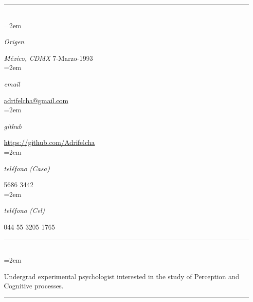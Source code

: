 \documentclass{scrartcl}
\newlength{\datebox}\settowidth{\datebox}{September 2017} %
\newcommand{\NewEntry}[3]{\noindent\hangindent=2em\hangafter=0 \parbox{\datebox}{\small \textit{#1}}\hspace{1.5em} #2 #3 %
\vspace{0.5em}} %
\newcommand{\Description}[1]{\hangindent=2em\hangafter=0\noindent\raggedright\footnotesize{#1}\par\normalsize\vspace{1em}} %
\begin{document}
\thispagestyle{empty} %


\begin{cv}{\textbf{}}\vspace{1.5em} %

\hrule{}\vspace{1.5em}

\noindent{}\vspace{0.1em}\\ %

\NewEntry{Origen}{\textit{México, CDMX}}{7-Marzo-1993}\\ %
\NewEntry{email}{\href{mailto:adrifelcha@gmail.com}{adrifelcha@gmail.com}}\\ %
\NewEntry{github}{\href{https://github.com/Adrifelcha}{https://github.com/Adrifelcha}}\\ %
\NewEntry{teléfono (Casa)}{5686 3442}\\ %
\NewEntry{teléfono (Cel)}{044 55 3205 1765}\\%

\hrule{}\vspace{1.5em}

\noindent{}\vspace{0.1em}\\ %

\Description{Undergrad experimental psychologist interested in the study of Perception and Cognitive processes.}\vspace{1em} %

\hrule{}\vspace{1.5em}




\end{cv}
\end{document}
